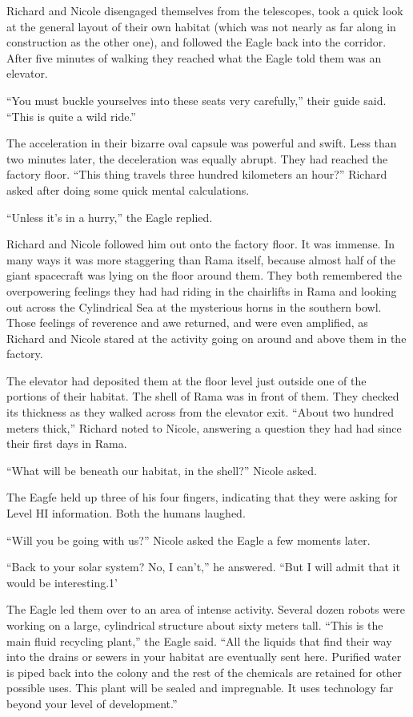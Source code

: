 \documentclass[]{article}
\begin{document}
{Richard and Nicole disengaged themselves from the telescopes, took a quick look at the general layout of their own habitat (which was not nearly as far along in construction as the other one), and followed the Eagle back into the corridor.  After five minutes of walking they reached what the Eagle told them was an elevator.

“You must buckle yourselves into these seats very carefully,” their guide said.  “This is quite a wild ride.”

The acceleration in their bizarre oval capsule was powerful and swift.  Less than two minutes later, the deceleration was equally abrupt.  They had reached the factory floor.  “This thing travels three hundred kilometers an hour?” Richard asked after doing some quick mental calculations.

“Unless it’s in a hurry,” the Eagle replied.

Richard and Nicole followed him out onto the factory floor.  It was immense.  In many ways it was more staggering than Rama itself, because almost half of the giant spacecraft was lying on the floor around them.  They both remembered the overpowering feelings they had had riding in the chairlifts in Rama and looking out across the Cylindrical Sea at the mysterious horns in the southern bowl.  Those feelings of reverence and awe returned, and were even amplified, as Richard and Nicole stared at the activity going on around and above them in the factory.

The elevator had deposited them at the floor level just outside one of the portions of their habitat.  The shell of Rama was in front of them.  They checked its thickness as they walked across from the elevator exit.  “About two hundred meters thick,” Richard noted to Nicole, answering a question they had had since their first days in Rama.

“What will be beneath our habitat, in the shell?” Nicole asked.

The Eagfe held up three of his four fingers, indicating that they were asking for Level HI information.  Both the humans laughed.

“Will you be going with us?” Nicole asked the Eagle a few moments later.

“Back to your solar system? No, I can’t,” he answered.  “But I will admit that it would be interesting.1’

The Eagle led them over to an area of intense activity.  Several dozen robots were working on a large, cylindrical structure about sixty meters tall.  “This is the main fluid recycling plant,” the Eagle said.  “All the liquids that find their way into the drains or sewers in your habitat are eventually sent here.  Purified water is piped back into the colony and the rest of the chemicals are retained for other possible uses.  This plant will be sealed and impregnable.  It uses technology far beyond your level of development.”

}
\end{document}
